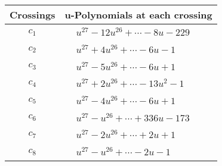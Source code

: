\documentclass[1p]{elsarticle_modified}
\theoremstyle{definition}
\begin{document}
\begin{tabular}{m{50pt}|m{274pt}}
Crossings & \hspace{64pt}u-Polynomials at each crossing \\
\hline $$\begin{aligned}c_{1}\end{aligned}$$&$\begin{aligned}
&u^{27}-12 u^{26}+\cdots-8 u-229
\end{aligned}$\\
\hline $$\begin{aligned}c_{2}\end{aligned}$$&$\begin{aligned}
&u^{27}+4 u^{26}+\cdots-6 u-1
\end{aligned}$\\
\hline $$\begin{aligned}c_{3}\end{aligned}$$&$\begin{aligned}
&u^{27}-5 u^{26}+\cdots-6 u+1
\end{aligned}$\\
\hline $$\begin{aligned}c_{4}\end{aligned}$$&$\begin{aligned}
&u^{27}+2 u^{26}+\cdots-13 u^2-1
\end{aligned}$\\
\hline $$\begin{aligned}c_{5}\end{aligned}$$&$\begin{aligned}
&u^{27}-4 u^{26}+\cdots-6 u+1
\end{aligned}$\\
\hline $$\begin{aligned}c_{6}\end{aligned}$$&$\begin{aligned}
&u^{27}- u^{26}+\cdots+336 u-173
\end{aligned}$\\
\hline $$\begin{aligned}c_{7}\end{aligned}$$&$\begin{aligned}
&u^{27}-2 u^{26}+\cdots+2 u+1
\end{aligned}$\\
\hline $$\begin{aligned}c_{8}\end{aligned}$$&$\begin{aligned}
&u^{27}- u^{26}+\cdots-2 u-1
\end{aligned}$\\

\end{tabular}
\end{document}
